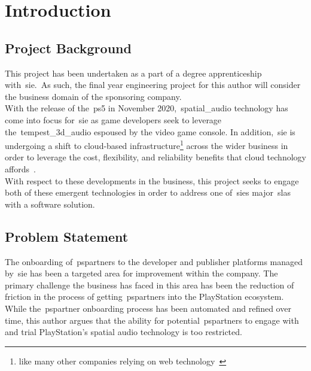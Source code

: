 \thispagestyle{plain}
\newpage
\section{Introduction}\label{sec:introduction}
\subsection{Project Background}\label{subsec:project-background}
\normalsize

This project has been undertaken as a part of a degree apprenticeship with~\gls{sie}.\
As such, the final year engineering project for this author will consider the business domain of the sponsoring company.\\

With the release of the~\gls{ps5} in November 2020,~\gls{spatial_audio} technology has come into focus for~\gls{sie} as game developers seek to leverage the~\gls{tempest_3d_audio} espoused by the video game console.
In addition,~\gls{sie} is undergoing a shift to cloud-based infrastructure\footnote{like many other companies relying on web technology~\citep{cc_overview}} across the wider business in order to leverage the cost, flexibility, and reliability benefits that cloud technology affords~\citep{cc_overview}.\\

With respect to these developments in the business, this project seeks to engage both of these emergent technologies in order to address one of~\gls{sie}\textquotesingle s major~\glspl{sla} with a software solution.\\

\subsection{Problem Statement}\label{subsec:problem-statement}

The onboarding of~\glspl{pspartner} to the developer and publisher platforms managed by~\gls{sie} has been a targeted area for improvement within the company.
The primary challenge the business has faced in this area has been the reduction of friction in the process of getting~\glspl{pspartner} into the PlayStation ecosystem.\\

While the~\gls{pspartner} onboarding process has been automated and refined over time, this author argues that the ability for potential~\glspl{pspartner} to engage with and trial PlayStation's spatial audio technology is too restricted.\\

